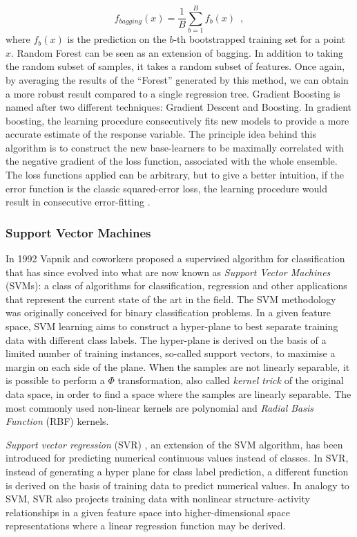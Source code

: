 \begin{equation}
    f_{bagging}(x) = \frac{1}{B}\sum_{b=1}^Bf_b(x)
    \enspace,
\end{equation}
where $f_b(x)$ is the prediction on the $b$-th bootstrapped training set for a point $x$.
Random Forest can be seen as an extension of bagging. In addition to taking the random subset of samples, it takes a random subset of features. Once again, by averaging the results of the “Forest” generated by this method, we can obtain a more robust result compared to a single regression tree. 
Gradient Boosting is named after two different techniques: Gradient Descent and Boosting. In gradient boosting, the learning procedure consecutively fits new models to provide a more accurate estimate of the response variable. The principle idea behind this algorithm is to construct the new base-learners to be maximally correlated with the negative gradient of the loss function, associated with the whole ensemble. The loss functions applied can be arbitrary, but to give a better intuition, if the error function is the classic squared-error loss, the learning procedure would result in consecutive error-fitting \citep{natekin2013gradient}. 

\subsubsection{Support Vector Machines} \label{Support Vector Machines}

In 1992 Vapnik and coworkers \citep{boser1992training} proposed a supervised algorithm for classification that has since evolved into what are now known as \textit{Support Vector Machines} (SVMs): a class of algorithms for classification, regression and other applications that represent the current state of the art in the field.
The SVM methodology was originally conceived for binary classification problems. In a given feature space, SVM learning aims to construct a hyper-plane to best separate training data with different class labels. The hyper-plane is derived on the basis of a limited number of training instances, so-called support vectors, to maximise a margin on each side of the plane. When the samples are not linearly separable, it is possible to perform a $\Phi$ transformation, also called \textit{kernel trick} of the original data space, in order to find a space where the samples are linearly separable. The most commonly used non-linear kernels are polynomial and \textit{Radial Basis Function} (RBF) kernels.

\textit{Support vector regression} (SVR) \citep{drucker1997support}, an extension of the SVM algorithm, has been introduced for predicting numerical continuous values instead of classes. In SVR, instead of generating a hyper plane for class label prediction, a different function is derived on the basis of training data to predict numerical values. In analogy to SVM, SVR also projects training data with nonlinear structure–activity relationships in a given feature space into higher-dimensional space representations where a linear regression function may be derived.

